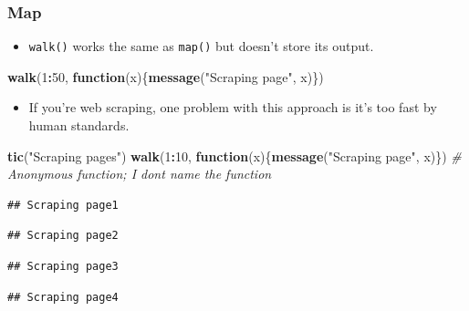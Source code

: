 \documentclass[
]{book}
\newenvironment{Shaded}{\begin{snugshade}}{\end{snugshade}}
\newcommand{\CommentTok}[1]{\textcolor[rgb]{0.56,0.35,0.01}{\textit{#1}}}
\newcommand{\ControlFlowTok}[1]{\textcolor[rgb]{0.13,0.29,0.53}{\textbf{#1}}}
\newcommand{\DecValTok}[1]{\textcolor[rgb]{0.00,0.00,0.81}{#1}}
\newcommand{\FunctionTok}[1]{\textcolor[rgb]{0.13,0.29,0.53}{\textbf{#1}}}
\newcommand{\NormalTok}[1]{#1}
\newcommand{\SpecialCharTok}[1]{\textcolor[rgb]{0.81,0.36,0.00}{\textbf{#1}}}
\newcommand{\StringTok}[1]{\textcolor[rgb]{0.31,0.60,0.02}{#1}}
\providecommand{\tightlist}{%
  \setlength{\itemsep}{0pt}\setlength{\parskip}{0pt}}
\begin{document}
\subsubsection{Map}\label{map}

\begin{itemize}
\tightlist
\item
  \texttt{walk()} works the same as \texttt{map()} but doesn't store its output.
\end{itemize}

\begin{Shaded}
\begin{Highlighting}[]
\FunctionTok{walk}\NormalTok{(}\DecValTok{1}\SpecialCharTok{:}\DecValTok{50}\NormalTok{, }\ControlFlowTok{function}\NormalTok{(x)\{}\FunctionTok{message}\NormalTok{(}\StringTok{"Scraping page"}\NormalTok{, x)\})}
\end{Highlighting}
\end{Shaded}

\begin{itemize}
\tightlist
\item
  If you're web scraping, one problem with this approach is it's too fast by human standards.
\end{itemize}

\begin{Shaded}
\begin{Highlighting}[]
\FunctionTok{tic}\NormalTok{(}\StringTok{"Scraping pages"}\NormalTok{)}
\FunctionTok{walk}\NormalTok{(}\DecValTok{1}\SpecialCharTok{:}\DecValTok{10}\NormalTok{, }\ControlFlowTok{function}\NormalTok{(x)\{}\FunctionTok{message}\NormalTok{(}\StringTok{"Scraping page"}\NormalTok{, x)\}) }\CommentTok{\# Anonymous function; I don\textquotesingle{}t name the function }
\end{Highlighting}
\end{Shaded}

\begin{verbatim}
## Scraping page1
\end{verbatim}

\begin{verbatim}
## Scraping page2
\end{verbatim}

\begin{verbatim}
## Scraping page3
\end{verbatim}

\begin{verbatim}
## Scraping page4
\end{verbatim}
\end{document}
